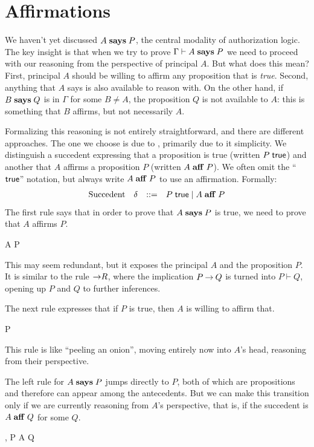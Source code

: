 \documentclass[11pt]{article}
\begin{document}
\section{Affirmations}
\label{sec:affirmations}

We haven't yet discussed $A \mathrel{\mathbf{says}} P$, the central modality of authorization
logic.  The key insight is that when we try to prove $\Gamma \vdash A \mathrel{\mathbf{says}} P$
we need to proceed with our reasoning from the perspective of principal $A$.
But what does this mean?  First, principal $A$ should be willing to affirm any
proposition that is \emph{true}.  Second, anything that $A$ says is also
available to reason with.  On the other hand, if $B \mathrel{\mathbf{says}} Q$ is in $\Gamma$ for
some $B \neq A$, the proposition $Q$ is not available to $A$: this is something
that $B$ affirms, but not necessarily $A$.

Formalizing this reasoning is not entirely straightforward, and there are
different approaches.  The one we choose is due to \citet{Garg06csfw}, primarily
due to it simplicity.  We distinguish a succedent expressing that a proposition
is true (written $P\; \mathsf{true}$) and another that $A$ affirms a proposition $P$
(written $A \mathrel{\mathbf{aff}} P$).  We often omit the ``$\mathsf{true}$'' notation, but always
write $A \mathrel{\mathbf{aff}} P$ to use an affirmation.  Formally:
\[
  \begin{array}{llcl}
    \mbox{Succedent} & \delta & ::= & P\; \mathsf{true} \mid A \mathrel{\mathbf{aff}} P
  \end{array}
\]
The first rule says that in order to prove that $A \mathrel{\mathbf{says}} P$ is true,
we need to prove that $A$ affirms $P$.
\begin{rules}
  {\Gamma \vdash A \aff P}
\end{rules}
This may seem redundant, but it exposes the principal $A$ and the proposition
$P$.  It is similar to the rule ${\mathbin{\rightarrow}}R$, where the implication $P \mathbin{\rightarrow} Q$
is turned into $P \vdash Q$, opening up $P$ and $Q$ to further inferences.

The next rule expresses that if $P$ is true, then $A$ is willing to affirm that.
\begin{rules}
  {\Gamma \vdash P\; }
\end{rules}
This rule is like ``peeling an onion'', moving entirely now into $A$'s head,
reasoning from their perspective.

The left rule for $A \mathrel{\mathbf{says}} P$ jumps directly to $P$, both of which are
propositions and therefore can appear among the antecedents.  But we can
make this transition only if we are currently reasoning from $A$'s perspective,
that is, if the succedent is $A \mathrel{\mathbf{aff}} Q$ for some $Q$.
\begin{rules}
  {\Gamma, P \vdash A \aff Q}
\end{rules}
\end{document}
